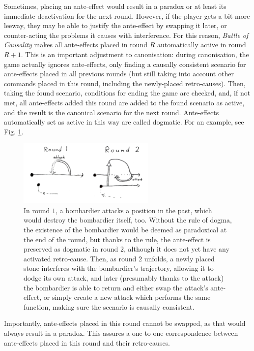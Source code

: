 \documentclass[12pt]{article}
\begin{document}
	Sometimes, placing an ante-effect would result in a paradox or at least its immediate deactivation for the next round. However, if the player gets a bit more leeway, they may be able to justify the ante-effect by swapping it later, or counter-acting the problems it causes with interference. For this reason, \textit{Battle of Causality} makes all ante-effects placed in round $R$ automatically active in round $R+1$. This is an important adjustment to canonisation: during canonisation, the game actually ignores ante-effects, only finding a causally consistent scenario for ante-effects placed in all previous rounds (but still taking into account other commands placed in this round, including the newly-placed retro-causes). Then, taking the found scenario, conditions for ending the game are checked, and, if not met, all ante-effects added this round are added to the found scenario as active, and the result is the canonical scenario for the next round. Ante-effects automatically set as active in this way are called dogmatic. For an example, see Fig. \ref{fig:dogma}.
	
	\begin{figure}[h]
\begin{center}
    \includegraphics[width=0.6\textwidth]{images/diag_dogma}
 \caption{In round $1$, a bombardier attacks a position in the past, which would destroy the bombardier itself, too. Without the rule of dogma, the existence of the bombardier would be deemed as paradoxical at the end of the round, but thanks to the rule, the ante-effect is preserved as dogmatic in round $2$, although it does not yet have any activated retro-cause. Then, as round $2$ unfolds, a newly placed stone interferes with the bombardier's trajectory, allowing it to dodge its own attack, and later (presumably thanks to the attack) the bombardier is able to return and either swap the attack's ante-effect, or simply create a new attack which performs the same function, making sure the scenario is causally consistent.}\label{fig:dogma}
\end{center}
\end{figure}
	
	Importantly, ante-effects placed in this round cannot be swapped, as that would always result in a paradox. This assures a one-to-one correspondence between ante-effects placed in this round and their retro-causes.
	
\end{document}
